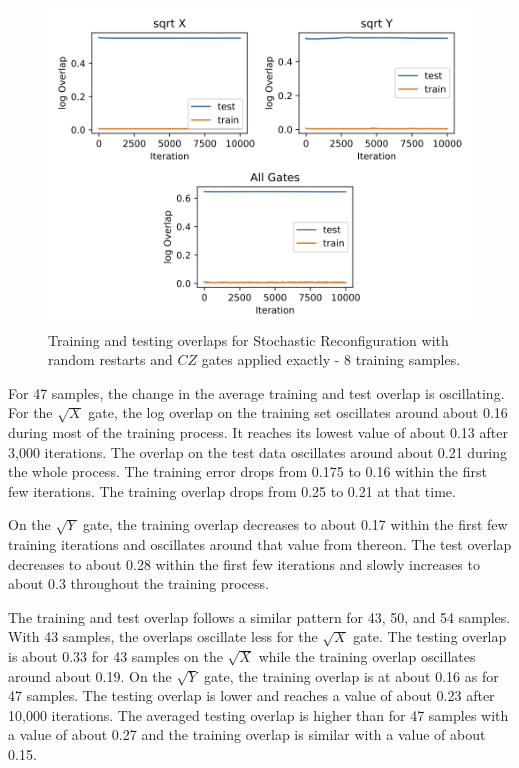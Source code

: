 \begin{figure}[H]
  \centering
  \includegraphics[width=\textwidth]{figures/results/sr-restarts-not-learned/avgOverlap_8.png}
  \caption[Training and Testing Overlaps for Stochastic Reconfiguration with Random Restarts and $CZ$ Gates Applied Exactly - 8 Samples]{
  Training and testing overlaps for Stochastic Reconfiguration with random restarts and $CZ$ gates applied exactly - 8 training samples.}
  \label{fig:sr_exact_overlap_8}
\end{figure}

For 47 samples, the change in the average training and test overlap is oscillating. For the 
$\sqrt{X}$ gate, the log overlap on the training set oscillates around about 0.16 during most 
of the training process. It 
reaches its lowest value of about 0.13 after 3,000 iterations. The overlap on the test data 
oscillates around about 0.21 during the whole process. The training error drops from 
0.175 to 0.16 within the first few iterations. The training overlap drops from 0.25 to 0.21 at that time.

On the $\sqrt{Y}$ gate, the training overlap decreases to about 0.17 within the first few training iterations 
and oscillates around that value from thereon. The test overlap decreases to about 0.28 within the first few
iterations and slowly increases to about 0.3 throughout the training process.

The training and test overlap follows a similar pattern for 43, 50, and 54 samples.
With 43 samples, the overlaps oscillate less for the $\sqrt{X}$ gate. The testing overlap is about 
0.33 for 43 samples on the $\sqrt{X}$ while the training overlap oscillates around about 0.19.
On the $\sqrt{Y}$ gate, the training overlap is at about 0.16 as for 47 samples. The testing overlap is 
lower and reaches a value of about 0.23 after 10,000 iterations. The averaged testing overlap is higher than 
for 47 samples with a value of about 0.27 and the training overlap is similar with a value of about 0.15.

